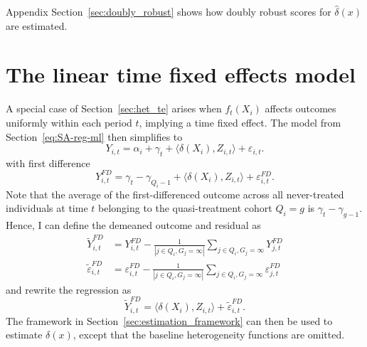 \documentclass[12pt,notitlepage]{article}
\begin{document}
Appendix Section~\ref{sec:doubly_robust} shows how doubly robust scores for $\hat{\delta}(x)$ are estimated.

\clearpage




\appendix

\clearpage
\section{The linear time fixed effects model}\label{sec:time_fe}
A special case of Section~\ref{sec:het_te} arises when $f_t(X_i)$ affects outcomes uniformly within each period $t$, implying a time fixed effect.
The model from Section~\ref{eq:SA-reg-ml} then simplifies to
\begin{equation*} 
Y_{i,t} = \alpha_i + \gamma_t
+ \langle \delta(X_i), Z_{i,t} \rangle + \varepsilon_{i,t}. \label{eq:SA-reg-ml-fe}
\end{equation*}
with first difference
\begin{equation*}
Y_{i,t}^{FD} = \gamma_t  - \gamma_{Q_i - 1} + \langle \delta(X_i), Z_{i,t} \rangle + \varepsilon_{i,t}^{FD}. \label{eq:SA-reg-ml-fd-fe}
\end{equation*}
Note that the average of the first-differenced outcome across all never-treated individuals at time $t$ belonging to the quasi-treatment cohort $Q_i = g$ is $\gamma_t - \gamma_{g - 1}$.
Hence, I can define the demeaned outcome and residual as
\begin{align*}
    \widetilde{Y}_{i, t}^{FD} &= Y_{i,t}^{FD} -  \frac{1}{|j \in Q_i, G_j = \infty|} \sum_{j \in Q_i, G_j = \infty} Y_{j,t}^{FD} \\
    \widetilde{\varepsilon}_{i, t}^{FD}&=  \varepsilon_{i,t}^{FD} - \frac{1}{|j \in Q_i, G_j = \infty|} \sum_{j \in Q_i, G_j = \infty} \varepsilon_{j,t}^{FD}
\end{align*}
and rewrite the regression as  
\begin{equation*}
\widetilde{Y}_{i,t}^{FD} = \langle \delta(X_i) , Z_{i,t} \rangle + \widetilde{\varepsilon}_{i,t}^{FD} .
\end{equation*}
The framework in Section~\ref{sec:estimation_framework} can then be used to estimate $\delta(x)$, except that the baseline heterogeneity functions are omitted. 
\end{document}
